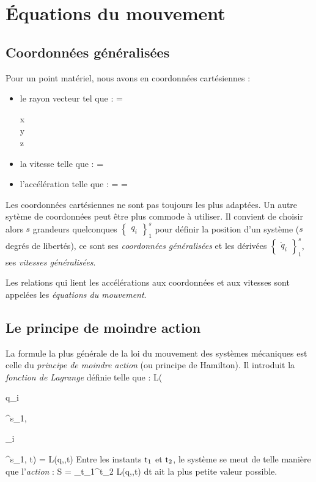 \chapter{\'Equations du mouvement}
\section{Coordonn\'ees g\'en\'eralis\'ees}

Pour un point mat\'eriel, nous avons en coordonn\'ees cart\'esiennes :
\begin{itemize}
\item le rayon vecteur tel que :
	\be
		 = \begin{pmatrix} x \\ y \\ z \end{pmatrix}
	\ee
\item la vitesse telle que :
	\be
		 = 
	\ee
\item l'acc\'el\'eration telle que :
	\be
		 =  = 
	\ee
\end{itemize}

Les coordonn\'ees cart\'esiennes ne sont pas toujours les plus adapt\'ees. Un autre syt\`eme de coordonn\'ees peut \^etre plus commode \`a utiliser. Il convient de choisir alors $s$ grandeurs quelconques $\begin{Bmatrix}q_{i}\end{Bmatrix}^{s}_{1}$ pour d\'efinir la position d'un syst\`eme ($s$ degr\'es de libert\'es), ce sont ses \emph{coordonn\'ees g\'en\'eralis\'ees} et les d\'eriv\'ees $\begin{Bmatrix}\dot{q}_{i}\end{Bmatrix}^{s}_{1}$, ses \emph{vitesses g\'en\'eralis\'ees}.

Les relations qui lient les acc\'el\'erations aux coordonn\'ees et aux vitesses sont appel\'ees les \emph{\'equations du mouvement}.

\section{Le principe de moindre action}

La formule la plus g\'en\'erale de la loi du mouvement des syst\`emes mécaniques est celle du \emph{principe de moindre action} (ou principe de Hamilton). Il introduit la \emph{fonction de Lagrange} d\'efinie telle que :
\be
	L(\begin{Bmatrix}q_{i}\end{Bmatrix}^{s}_{1},\begin{Bmatrix}_{i}\end{Bmatrix}^{s}_{1}, {\rm t}) = L(q,,{\rm t})
\ee
Entre les instants ${\rm t}_{1}$ et ${\rm t}_{2}$, le système se meut de telle mani\`ere que l'\emph{action} :
\be
	S = \int_{{\rm t}_{1}}^{{\rm t}_{2}} L(q,,{\rm t}) d{\rm t} \label{EQ:2_1}
\ee
ait la plus petite valeur possible.

